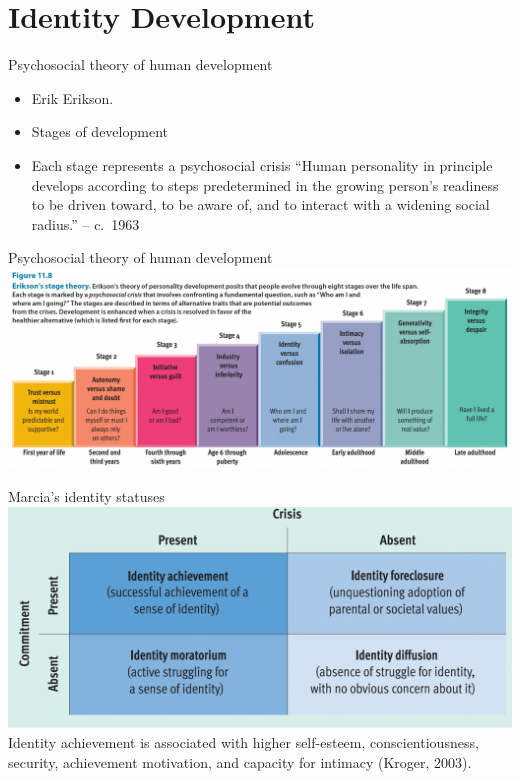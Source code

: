 \documentclass[
  ignorenonframetext,
  aspectratio=169,
]{beamer}
\providecommand{\tightlist}{%
  \setlength{\itemsep}{0pt}\setlength{\parskip}{0pt}}\usepackage{longtable,booktabs,array}
\begin{document}
\section{Identity Development}\label{identity-development}

\begin{frame}{Psychosocial theory of human development}
\label{psychosocial-theory-of-human-development}
\begin{itemize}[<+->]
\tightlist
\item
  Erik Erikson.
\item
  Stages of development
\item
  Each stage represents a psychosocial crisis ``Human personality in
  principle develops according to steps predetermined in the growing
  person's readiness to be driven toward, to be aware of, and to
  interact with a widening social radius.'' -- c.~1963
\end{itemize}
\end{frame}

\begin{frame}{Psychosocial theory of human development}
\label{psychosocial-theory-of-human-development-1}
\includegraphics{figs/stages.png}
\end{frame}

\begin{frame}{Marcia's identity statuses}
\label{marcias-identity-statuses}
\includegraphics{figs/marcia.png} Identity achievement is associated
with higher self-esteem, conscientiousness, security, achievement
motivation, and capacity for intimacy (Kroger, 2003).
\end{frame}
\end{document}

